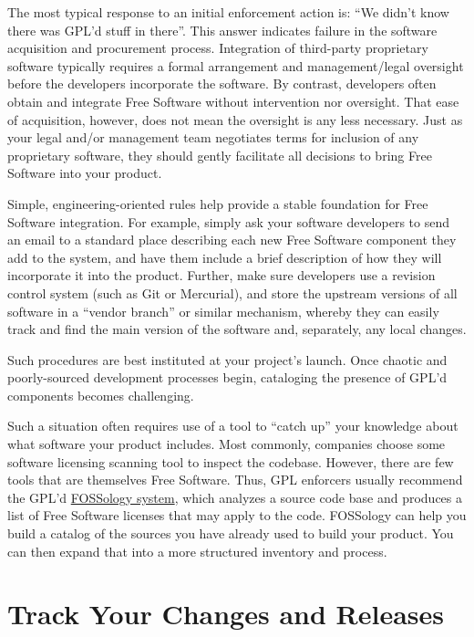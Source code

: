 The most typical response to an initial enforcement action is: ``We
didn't know there was GPL'd stuff in there''.  This answer indicates
failure in the software acquisition and procurement process.  Integration
of third-party proprietary software typically requires a formal
arrangement and management/legal oversight before the developers
incorporate the software.  By contrast, developers often obtain and
integrate Free Software without intervention nor oversight. That ease of acquisition, however,
does not mean the oversight is any less necessary.  Just as your legal
and/or management team negotiates terms for inclusion of any proprietary
software, they should gently facilitate all decisions to bring Free Software into your
product.

Simple, engineering-oriented rules help provide a stable foundation for
Free Software integration.  For example, simply ask your software developers to send an email to a
standard place describing each new Free Software component they add to the system,
and have them include a brief description of how they will incorporate it
into the product.  Further, make sure developers use a revision control
system (such as Git or Mercurial), and
store the upstream versions of all software in a ``vendor branch'' or
similar mechanism, whereby they can easily track and find the main version
of the software and, separately, any local changes.

Such procedures are best instituted at your project's launch.  Once 
chaotic and poorly-sourced development processes begin, cataloging the
presence of GPL'd components  becomes challenging.

Such a situation often requires use of a tool to ``catch up'' your knowledge
about what software your product includes.  Most commonly, companies choose
some software licensing scanning tool to inspect the codebase.  However,
there are few tools that are themselves Free Software.  Thus, GPL enforcers
usually recommend the GPL'd
\href{http://fossology.org/}{FOSSology system}, which analyzes a
source code base and produces a list of Free Software licenses that may apply to
the code.  FOSSology can help you build a catalog of the sources you have
already used to build your product.  You can then expand that into a more
structured inventory and process.

\section{Track Your Changes and Releases}

